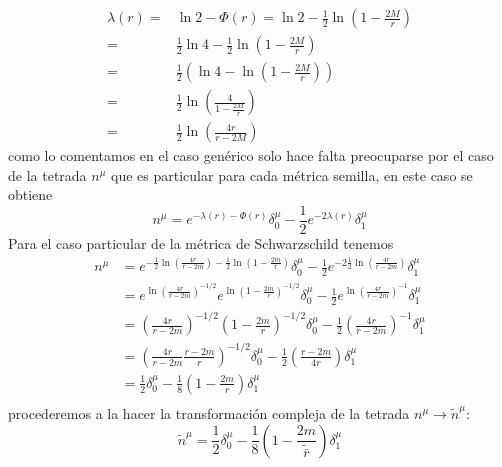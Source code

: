 \begin{equation}
    \begin{aligned}
        \lambda(r)= & \ln 2-\Phi(r)=\ln 2-\frac{1}{2} \ln \left(1-\frac{2 M}{r}\right)   \\
        =           & \frac{1}{2}\ln 4 -\frac{1}{2} \ln \left(1-\frac{2 M}{r}\right)     \\
        =           & \frac{1}{2} \left(\ln 4 -  \ln \left(1-\frac{2 M}{r}\right)\right) \\
        =           & \frac{1}{2} \ln \left(\frac{4}{1-\frac{2 M}{r}}\right)             \\
        =           & \frac{1}{2} \ln \left(\frac{4 r}{r-2 M}\right)
    \end{aligned}
\end{equation}
como lo comentamos en el caso genérico solo hace falta preocuparse por el caso de la tetrada $n^\mu$ que es particular para cada métrica semilla, en este caso se obtiene
\begin{equation}
    n^\mu=e^{-\lambda(r)-\Phi(r)} \delta_0^\mu-\frac{1}{2} e^{-2 \lambda(r)} \delta_1^\mu
\end{equation}
Para el caso particular de la métrica de Schwarzschild tenemos
\begin{equation}
   \begin{aligned}
    n^\mu&=e^{- \frac{1}{2} \ln \left(\frac{4 r}{r-2 m}\right) -\frac{1}{2} \ln \left(1-\frac{2 m}{r}\right)  }\delta_0^\mu-\frac{1}{2} e^{-2 \frac{1}{2} \ln \left(\frac{4 r}{r-2 m}\right)} \delta_1^\mu \\
    &=e^{\ln \left(\frac{4 r}{r-2 m}\right)^{-1/2}}e^{\ln \left(1-\frac{2 m}{r}\right)^{-1/2}} \delta_0^\mu-\frac{1}{2} e^{\ln \left(\frac{4 r}{r-2 m}\right)^{-1}} \delta_1^\mu \\
    &=\left(\frac{4 r}{r-2 m}\right)^{-1/2}\left(1-\frac{2 m}{r}\right)^{-1/2} \delta_0^\mu-\frac{1}{2} \left(\frac{4 r}{r-2 m}\right)^{-1} \delta_1^\mu \\ 
    &=\left(\frac{4 r}{r-2 m}\frac{r - 2 m}{r}\right)^{-1/2}\delta_0^\mu-\frac{1}{2} \left(\frac{r-2 m}{4r}\right)\delta_1^\mu \\
    &= \frac{1}{2}\delta_0^\mu-\frac{1}{8} \left(1 - \frac{2 m}{r}\right)\delta_1^\mu \\
   \end{aligned}
\end{equation}
procederemos a la hacer la transformación compleja de la tetrada $n^\mu \to \tilde{n}^\mu$:
\begin{equation}
    \tilde{n}^\mu=\frac{1}{2}\delta_0^\mu-\frac{1}{8} \left(1 - \frac{2 m}{\tilde{\bar{r} }}\right)\delta_1^\mu 
\end{equation}
